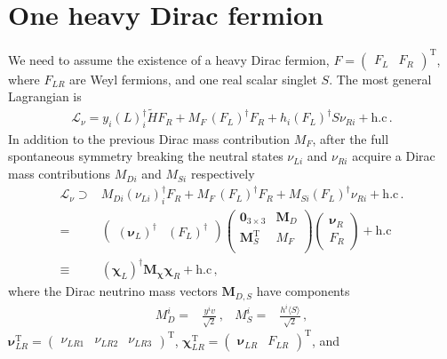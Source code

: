 \section{One heavy Dirac fermion}
We need to assume the existence of a heavy Dirac fermion, $F=
\begin{pmatrix}
  F_L & F_R
\end{pmatrix}^{\operatorname{T}}$, where $F_{LR}$ are Weyl fermions, and one real scalar singlet $S$. The most general Lagrangian is~\cite{Roncadelli:1983ty}
\begin{align}
  \mathcal{L}_{\nu}=y_i \left( L \right)^{\dagger}_i\widetilde{H}  F_R 
  + M_F\, \left( F_L \right)^{\dagger}  F_R + h_i \left( F_L \right)^{\dagger} S \nu_{Ri}+   \text{h.c}\,.
\end{align}
In addition to the previous Dirac mass contribution $M_F$, after the full spontaneous symmetry  breaking the neutral states $\nu_{Li}$ and $\nu_{Ri}$  acquire a Dirac mass contributions $M_{Di}$ and $M_{Si}$ respectively
\begin{align}
  \mathcal{L}_{\nu}\supset & M_{Di} \left( \nu_{Li} \right)^{\dagger}_i  F_R 
  + M_F\, \left( F_L \right)^{\dagger}  F_R + M_{Si} \left( F_L \right)^{\dagger}  \nu_{Ri}+   \text{h.c}\,. \nonumber\\
  =&\begin{pmatrix} \left( \boldsymbol{\nu}_{L} \right)^\dagger  & \left( F_L \right)^{\dagger}  \end{pmatrix}
 \begin{pmatrix}
   \mathbf{0}_{3 \times 3} &            \boldsymbol{M}_D \\
   \boldsymbol{M}_S^{\operatorname{T}} & M_F \\
 \end{pmatrix}
\begin{pmatrix} \boldsymbol{\nu}_{R}  \\
    F_R  \end{pmatrix}+\text{h.c} \nonumber\\
  \equiv& \left( \boldsymbol{\chi}_L \right)^\dagger \boldsymbol{M_{\chi}} \boldsymbol{\chi}_R+\text{h.c}\,,
\end{align}
where the Dirac neutrino mass vectors $\boldsymbol{M}_{D,S}$ have components
\begin{align}
  M_D^i=&\frac{y^i v}{\sqrt{2}}\,,&   M_S^i=&\frac{h^i \langle S\rangle}{\sqrt{2}}\,,
\end{align}
 $\boldsymbol{\nu}_{LR}^{\operatorname{T}}=
\begin{pmatrix}\nu_{LR1} & \nu_{LR2} & \nu_{LR3} \end{pmatrix}^{\operatorname{T}}$, $\boldsymbol{\chi}_{LR}^{\operatorname{T}}=\begin{pmatrix} \boldsymbol{\nu}_{LR}  & F_{LR}  \end{pmatrix}^{\operatorname{T}}$, and
